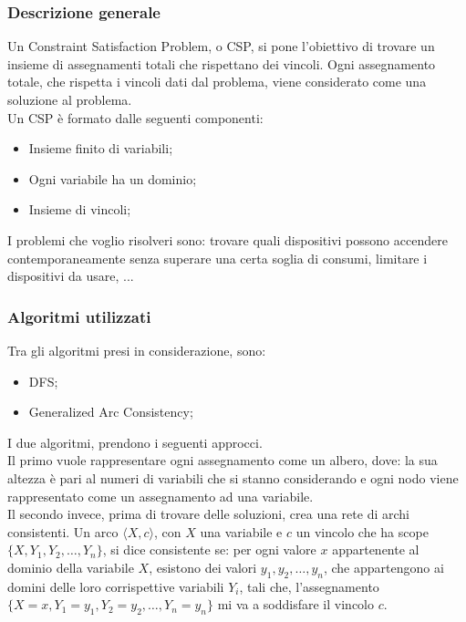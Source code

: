 \documentclass[12pt, letterpaper]{article}
\begin{document}
\subsubsection{Descrizione generale}

Un Constraint Satisfaction Problem, o CSP, si pone l'obiettivo di trovare un insieme di assegnamenti totali che
rispettano dei vincoli. Ogni assegnamento totale, che rispetta i vincoli dati dal problema,  viene considerato come
una soluzione al problema. \\

\noindent Un CSP è formato dalle seguenti componenti:
\begin{itemize}
      \item Insieme finito di variabili;
      \item Ogni variabile ha un dominio;
      \item Insieme di vincoli;
\end{itemize}

\noindent I problemi che voglio risolveri sono: trovare quali dispositivi possono accendere
contemporaneamente senza superare una certa soglia di consumi, limitare i dispositivi da usare, ...

\subsubsection{Algoritmi utilizzati}

Tra gli algoritmi presi in considerazione, sono:

\begin{itemize}
      \item DFS;
      \item Generalized Arc Consistency;
\end{itemize}

\noindent I due algoritmi, prendono i seguenti approcci. \\

\noindent Il primo vuole rappresentare ogni assegnamento come un albero, dove: la sua altezza è
pari al numeri di variabili che si stanno considerando e ogni nodo viene rappresentato come un
assegnamento ad una variabile. \\

\noindent Il secondo invece, prima di trovare delle soluzioni, crea una rete di archi consistenti.
Un arco $\langle X, c \rangle$, con $X$ una variabile e $c$ un vincolo che ha
scope $\{X, Y_1, Y_2, \dots, Y_n\}$, si dice consistente se: per ogni valore $x$ appartenente al dominio
della variabile $X$, esistono dei valori $y_1, y_2, \dots, y_n$, che appartengono ai domini delle loro
corrispettive variabili $Y_i$, tali che, l'assegnamento \\
$\{X=x, Y_1=y_1, Y_2=y_2, \dots, Y_n=y_n\}$ mi va a soddisfare il vincolo $c$. \\
\end{document}

